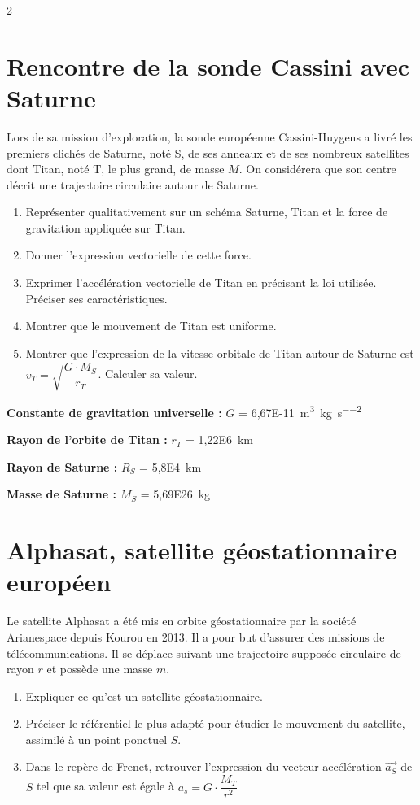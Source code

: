 \documentclass[a4paper,12pt,fleqn]{scrartcl}%
\begin{document}
\begin{multicols}{2}
\section{Rencontre de la sonde Cassini avec Saturne}
Lors de sa mission d'exploration, la sonde européenne Cassini-Huygens a livré les premiers clichés de Saturne, noté S, de ses anneaux et de ses nombreux satellites dont Titan, noté T, le plus grand, de masse $M$. On considérera que son centre décrit une trajectoire circulaire autour de Saturne.
\begin{enumerate}
	\item Représenter qualitativement sur un schéma Saturne, Titan et la force de gravitation appliquée sur Titan.
	\item Donner l'expression vectorielle de cette force.
	\item Exprimer l'accélération vectorielle de Titan en précisant la loi utilisée. Préciser ses caractéristiques.
	\item Montrer que le mouvement de Titan est uniforme.
	\item Montrer que l'expression de la vitesse orbitale de Titan autour de Saturne est $v_T = \sqrt{\dfrac{G \cdot M_S}{r_T}}$. Calculer sa valeur.
\end{enumerate}
\begin{data}
\begin{itemize*}
	\item \textbf{Constante de gravitation universelle :} $G$ = \SI{6,67E-11}{ \meter \cubed \per \kilo \gram \per \second \squared}
	\item \textbf{Rayon de l'orbite de Titan :} $r_T$ = \SI{1,22E6}{\kilo \meter}
	\item \textbf{Rayon de Saturne :} $R_S$ = \SI{5,8E4}{\kilo \meter}
	\item \textbf{Masse de Saturne :} $M_S$ = \SI{5,69E26}{\kilo \gram}
\end{itemize*}
\end{data}

\section{Alphasat, satellite géostationnaire européen}
Le satellite Alphasat a été mis en orbite géostationnaire par la société Arianespace depuis Kourou en 2013. Il a pour but d'assurer des missions de télécommunications. Il se déplace suivant une trajectoire supposée circulaire de rayon $r$ et possède une masse $m$.
\begin{enumerate}
	\item Expliquer ce qu'est un satellite géostationnaire.
	\item Préciser le référentiel le plus adapté pour étudier le mouvement du satellite, assimilé à un point ponctuel $S$.
	\item Dans le repère de Frenet, retrouver l'expression du vecteur accélération $\vec{a_S}$ de $S$ tel que sa valeur est égale à $a_s=G \cdot \dfrac{M_T}{r^2}$
\end{enumerate}




\end{multicols}
\end{document}
